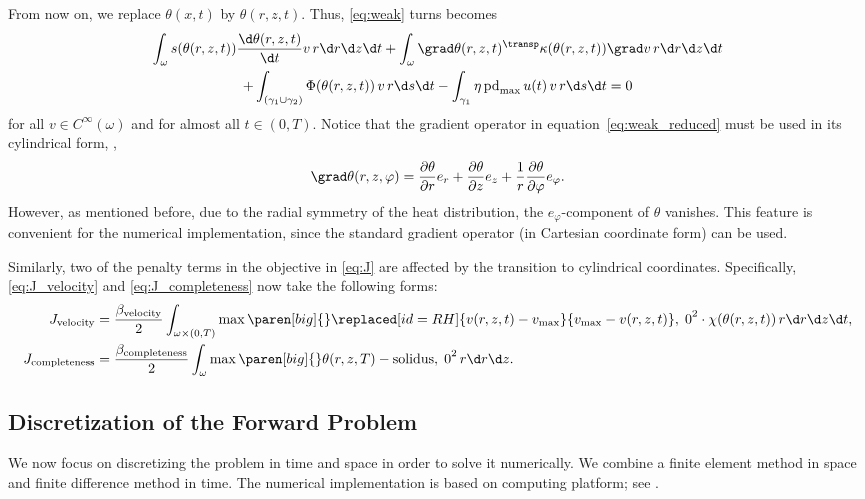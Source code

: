 From now on, we replace $\theta(x,t)$ by $\theta(r,z,t)$. 
Thus, \eqref{eq:weak} turns becomes
\begin{multline} \label{eq:weak_reduced}
	\int_\omega s(\theta(r,z,t)) \frac{\d \theta(r,z,t)}{\d t} v \, r \d r \d z \d t
	+
	\int_\omega \grad\theta(r,z,t)^\transp \kappa(\theta(r,z,t)) \grad v \, r \d r \d z \d t 
	\\
	+
	\int_{(\gamma_1 \cup \gamma_2)} \Phi(\theta(r,z,t)) \, v \, r \d s \d t -
	\int_{\gamma_1} \eta \, \text{pd}_{\max} \, u(t) \, v \, r \d s \d t 
	= 
	0
\end{multline}
for all $v \in C^\infty(\omega)$ and for almost all $t \in (0,T)$.
Notice that the gradient operator in equation~\eqref{eq:weak_reduced} must be used in its cylindrical form, \ie,
\begin{equation*}
	\grad \theta(r,z,\varphi) 
	=
	\frac{\partial \theta}{\partial r} e_r
	+
	\frac{\partial \theta}{\partial z} e_z
	+
	\frac{1}{r} \frac{\partial \theta}{\partial \varphi} e_{\varphi}
	.
\end{equation*}
However, as mentioned before, due to the radial symmetry of the heat distribution, the $e_{\varphi}$-component of $\theta$ vanishes. 
This feature is convenient for the numerical implementation, since the standard gradient operator (in Cartesian coordinate form) can be used.

Similarly, two of the penalty terms in the objective in \eqref{eq:J} are affected by the transition to cylindrical coordinates.
Specifically, \eqref{eq:J_velocity} and \eqref{eq:J_completeness} now take the following forms:
\begin{align}
	\label{eq:J_velocity_r}
	J_\text{velocity} 
	&
	=
	\frac{\beta_\text{velocity}}{2} \int_{\omega \times (0,T)} \max \paren[big]\{\}{\replaced[id=RH]{v(r,z,t) - v_{\max}}{v_{\max} - v(r,z,t)}, \; 0}^2 \cdot \chi(\theta(r,z,t)) \, r \d r \d z \d t
	, 
	\\
	\label{eq:J_completeness_r}
	J_\text{completeness} 
	&
	=
	\frac{\beta_\text{completeness}}{2} \int_{\omega} \max \paren[big]\{\}{\theta(r,z,T) - \text{solidus}, \; 0}^2 \, r \d r \d z
	.
\end{align}


\subsection{Discretization of the Forward Problem}

We now focus on discretizing the problem in time and space in order to solve it numerically. 
We combine a finite element method in space and finite difference method in time. 
The numerical implementation is based on \fenics computing platform; see \cite{LoggMardalWells:2012:1}.

